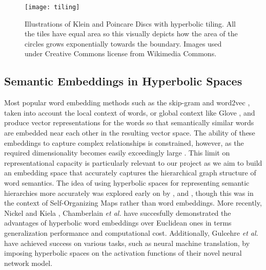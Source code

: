 \documentclass[12pt]{report}
\begin{document}
\begin{figure}
  \centering
	\texttt{[image: tiling]}
	\caption{Illustrations of Klein and Poincare Discs with hyperbolic tiling. All the tiles have equal area so this visually depicts how the area of the circles grows exponentially towards the boundary. Images used under Creative Commons license from Wikimedia Commons.}
	\label{fig:hyspace}
\end{figure}

\subsection{Semantic Embeddings in Hyperbolic Spaces} \label{sec:poincare}
Most popular word embedding methods such as the skip-gram and word2vec \cite{Mikolov2013}, \cite{Mikolov} taken into account the local context of words, or global context like Glove \cite{Pennington2014}, and produce vector representations for the words so that semantically similar words are embedded near each other in the resulting vector space. The ability of these embeddings to capture complex relationships is constrained, however, as the required dimensionality becomes easily exceedingly large \cite{Nickel2017} \cite{Chamberlain2017} \cite{Nickel2018}. This limit on representational capacity is particularly relevant to our project as we aim to build an embedding space that accurately captures the hierarchical graph structure of word semantics. The idea of using hyperbolic spaces for representing semantic hierarchies more accurately was explored early on by \cite{Ritter1999}, \cite{Ontrup2002} and \cite{Walter2006}, though this was in the context of Self-Organizing Maps rather than word embeddings. More recently, Nickel and Kiela \cite{Nickel2017}, Chamberlain \textit{et al.} \cite{Chamberlain2017} have succesfully demonstrated the advantages of hyperbolic word embeddings over Euclidean ones in terms generalization performance and computational cost. Additionally, Gulcehre \textit{et al.} \cite{Gulcehre2018} have achieved success on various tasks, such as neural machine translation, by imposing hyperbolic spaces on the activation functions of their novel neural network model.
\end{document}
